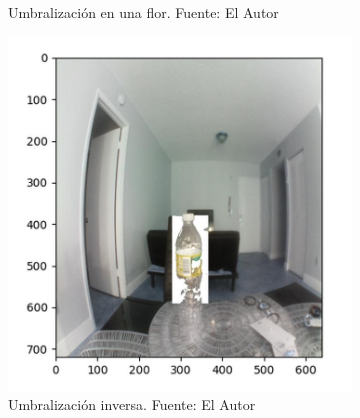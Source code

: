 \begin{figure}[H]
\begin{subfigure}[b]{0.4\textwidth}
        \caption[Umbralización en una flor.]{Umbralización en una flor. {\footnotesize Fuente: El Autor}}
        \label{otsu_position}
     \end{subfigure}
     \hfill
     \begin{subfigure}[b]{0.4\textwidth}
        \centering
        \includegraphics[scale=0.35]{Recursos/umbral_inverso.jpg}
        \caption[Umbralización inversa.]{Umbralización inversa. {\footnotesize Fuente: El Autor}}
        \label{otsu_inverso}
     \end{subfigure}
     \hfill
     \begin{subfigure}[b]{0.4\textwidth}
         \centering

\end{subfigure}
\end{figure}

